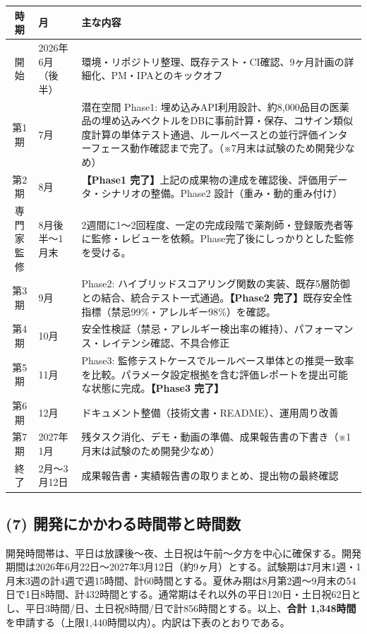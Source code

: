 \documentclass[11pt,a4paper,ja=minimal,xelatex]{bxjsarticle}
\newcommand{\refmark}{{\fontspec{BIZ UDGothic}※}}  %
\begin{document}
\begin{table}[H]
\centering
\small
\begin{tabular}{@{}c@{\quad}l@{\quad}>{\raggedright\arraybackslash}p{\dimexpr\linewidth-15em\relax}@{}}
\toprule
時期 & 月 & 主な内容 \\
\midrule
開始 & 2026年6月（後半） & 環境・リポジトリ整理、既存テスト・CI確認、9ヶ月計画の詳細化、PM・IPAとのキックオフ \\
第1期 & 7月 & 潜在空間 Phase1: 埋め込みAPI利用設計、約8,000品目の医薬品の埋め込みベクトルをDBに事前計算・保存、コサイン類似度計算の単体テスト通過、ルールベースとの並行評価インターフェース動作確認まで完了。（\refmark 7月末は試験のため開発少なめ） \\
第2期 & 8月 & \textbf{【Phase1 完了】}上記の成果物の達成を確認後、評価用データ・シナリオの整備。Phase2 設計（重み・動的重み付け） \\
専門家監修 & 8月後半～1月末 & 2週間に1〜2回程度、一定の完成段階で薬剤師・登録販売者等に監修・レビューを依頼。Phase完了後にしっかりとした監修を受ける。 \\
第3期 & 9月 & Phase2: ハイブリッドスコアリング関数の実装、既存5層防御との結合、統合テスト一式通過。\textbf{【Phase2 完了】}既存安全性指標（禁忌99\%・アレルギー98\%）を確認。 \\
第4期 & 10月 & 安全性検証（禁忌・アレルギー検出率の維持）、パフォーマンス・レイテンシ確認、不具合修正 \\
第5期 & 11月 & Phase3: 監修テストケースでルールベース単体との推奨一致率を比較。パラメータ設定根拠を含む評価レポートを提出可能な状態に完成。\textbf{【Phase3 完了】} \\
第6期 & 12月 & ドキュメント整備（技術文書・README）、運用周り改善 \\
第7期 & 2027年1月 & 残タスク消化、デモ・動画の準備、成果報告書の下書き（\refmark 1月末は試験のため開発少なめ） \\
終了 & 2月～3月12日 & 成果報告書・実績報告書の取りまとめ、提出物の最終確認 \\
\bottomrule
\end{tabular}
\end{table}

\subsection*{(7) 開発にかかわる時間帯と時間数}
開発時間帯は、平日は放課後〜夜、土日祝は午前〜夕方を中心に確保する。開発期間は2026年6月22日～2027年3月12日（約9ヶ月）とする。試験期は7月末1週・1月末3週の計4週で週15時間、計60時間とする。夏休み期は8月第2週～9月末の54日で1日8時間、計432時間とする。通常期はそれ以外の平日120日・土日祝62日とし、平日3時間/日、土日祝8時間/日で計856時間とする。以上、\textbf{合計 1,348時間}を申請する（上限1,440時間以内）。内訳は下表のとおりである。
\end{document}
